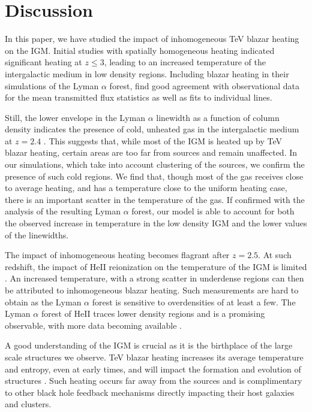 \documentclass[twocolumns]{emulateapj}
\newcommand\ALc[1]{{\color{red} \bf #1}} %
\begin{document}
{\ALc{
\section{Discussion}

In this paper, we have studied the impact of inhomogeneous TeV blazar heating on the IGM. Initial studies with spatially homogeneous heating \citep{2012ApJ...752...23C} indicated significant heating at $z\leqslant 3$, leading to an increased temperature of the intergalactic medium in low density regions. Including blazar heating in their simulations of the Lyman $\alpha$ forest, \citet{2012MNRAS.423..149P} find good agreement with observational data for the mean transmitted flux statistics as well as fits to individual lines.

Still, the lower envelope in the Lyman $\alpha$ linewidth as a function of column density indicates the presence of cold, unheated gas in the intergalactic medium at $z=2.4$ \citep{2012ApJ...757L..30R}. This suggests that, while most  of the IGM is heated up by TeV blazar heating, certain areas are too far from sources and remain unaffected.  In our simulations, which take into account clustering of the sources, we confirm the presence of such cold regions.  We find that, though most of the gas receives close to average heating, and has a temperature close to the uniform heating case, there is an important scatter in the temperature of the gas. If confirmed with the analysis of the resulting Lyman $\alpha$ forest, our model is able to account for both the observed increase in temperature in the low density IGM \citep{2014MNRAS.441.1916B,2009MNRAS.399L..39V} and the lower values  of the linewidths.

The impact of inhomogeneous heating becomes flagrant after $z=2.5$. At such redshift, the impact of HeII reionization  on the temperature of the IGM is  limited \citep{2013MNRAS.435.3169C}. An increased temperature, with a strong scatter in underdense regions can then be attributed to inhomogeneous blazar heating. Such measurements are hard to obtain as the Lyman $\alpha$ forest is sensitive to overdensities of at least a few.  The Lyman $\alpha$ forest of HeII traces lower density regions and is a promising observable, with more data becoming available \citep{2014arXiv1405.7405W}.

A good understanding of the IGM is crucial as it is the birthplace of the large scale structures we observe. TeV blazar heating increases its average temperature and entropy, even at early times, and will impact the formation and evolution of  structures \citep{2012ApJ...752...24P}. Such heating occurs far away from the sources and  is complimentary to other black hole feedback mechanisms directly impacting their host galaxies and clusters.

}}
\end{document}
